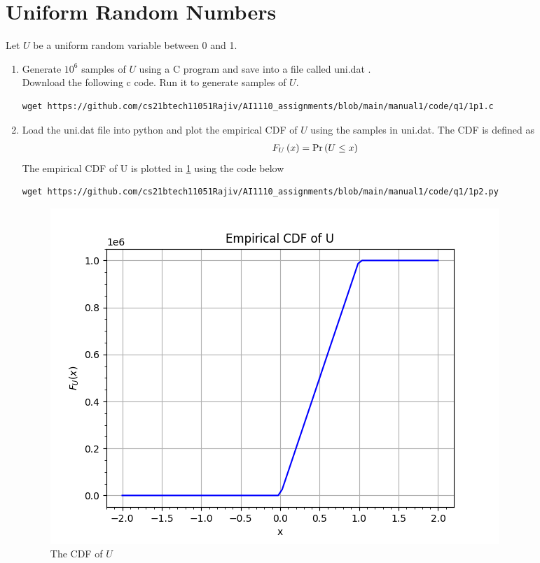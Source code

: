 \documentclass[journal,12pt,twocolumn]{IEEEtran}
\renewcommand\thesection{\arabic{section}}
\begin{document}
\section{Uniform Random Numbers}
Let $U$ be a uniform random variable between 0 and 1.
\begin{enumerate}[label=\thesection.\arabic*
,ref=\thesection.\theenumi]
\item Generate $10^6$ samples of $U$ using a C program and save into a file called uni.dat .
\\
\solution Download the following c code. Run it to generate samples of $U$.
\begin{lstlisting}
wget https://github.com/cs21btech11051Rajiv/AI1110_assignments/blob/main/manual1/code/q1/1p1.c
\end{lstlisting}
%
\item
Load the uni.dat file into python and plot the empirical CDF of $U$ using the samples in uni.dat. The CDF is defined as
\begin{align}
    F_{U}\left(x\right) = \Pr\left(U \le x\right)
\end{align}
\solution The empirical CDF of U is plotted in \ref{fig:uni_cdf} using the code below
\begin{lstlisting}
wget https://github.com/cs21btech11051Rajiv/AI1110_assignments/blob/main/manual1/code/q1/1p2.py
\end{lstlisting}
\begin{figure}[ht!]
    \centering
    \includegraphics[width=\columnwidth]{./figs/fig1.2.png}
    \caption{The CDF of $U$}
    \label{fig:uni_cdf}
\end{figure}

\end{enumerate}
\end{document}

